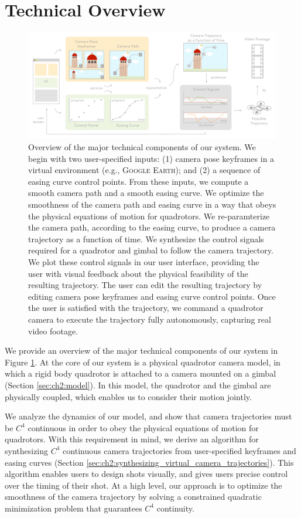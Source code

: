 \section{Technical Overview}

\begin{figure}[t]
\centering
\includegraphics[width=6.0in]{images/2015_siggraph_asia/system_overview}
\caption{
Overview of the major technical components of our system.
We begin with two user-specified inputs: (1) camera pose keyframes in a virtual environment (e.g., \textsc{Google Earth}); and (2) a sequence of easing curve control points.
From these inputs, we compute a smooth camera path and a smooth easing curve.
We optimize the smoothness of the camera path and easing curve in a way that obeys the physical equations of motion for quadrotors.
We re-paramterize the camera path, according to the easing curve, to produce a camera trajectory as a function of time.
We synthesize the control signals required for a quadrotor and gimbal to follow the camera trajectory.
We plot these control signals in our user interface, providing the user with visual feedback about the physical feasibility of the resulting trajectory.
The user can edit the resulting trajectory by editing camera pose keyframes and easing curve control points.
Once the user is satisfied with the trajectory, we command a quadrotor camera to execute the trajectory fully autonomously, capturing real video footage.
}
\label{figure:overview}
\end{figure}

We provide an overview of the major technical components of our system in Figure \ref{figure:overview}.
At the core of our system is a physical quadrotor camera model, in which a rigid body quadrotor is attached to a camera mounted on a gimbal (Section \ref{sec:ch2:model}).
In this model, the quadrotor and the gimbal are physically coupled, which enables us to consider their motion jointly.

We analyze the dynamics of our model, and show that camera trajectories must be $C^4$ continuous in order to obey the physical equations of motion for quadrotors.
With this requirement in mind, we derive an algorithm for synthesizing $C^4$ continuous camera trajectories from user-specified keyframes and easing curves (Section \ref{sec:ch2:synthesizing_virtual_camera_trajectories}).
This algorithm enables users to design shots visually, and gives users precise control over the timing of their shot.
At a high level, our approach is to optimize the smoothness of the camera trajectory by solving a constrained quadratic minimization problem that guarantees $C^4$ continuity.

